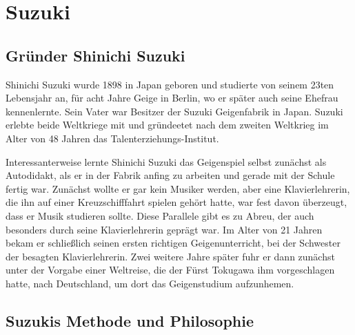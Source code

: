 \section{Suzuki}

\subsection{Gründer Shinichi Suzuki}

Shinichi Suzuki wurde 1898 in Japan geboren und studierte von seinem 23ten
Lebensjahr an, für acht Jahre Geige in Berlin, wo er später auch seine Ehefrau
kennenlernte. Sein Vater war Besitzer der Suzuki Geigenfabrik in Japan. Suzuki
erlebte beide Weltkriege mit und gründeetet nach dem zweiten Weltkrieg im Alter
von 48 Jahren das Talenterziehungs-Institut. 

Interessanterweise lernte Shinichi Suzuki das Geigenspiel selbst zunächst als
Autodidakt, als er in der Fabrik anfing zu arbeiten und gerade mit der Schule
fertig war. Zunächst wollte er gar kein Musiker werden, aber eine
Klavierlehrerin, die ihn auf einer Kreuzschifffahrt spielen gehört hatte, war
fest davon überzeugt, dass er Musik studieren sollte.
\autocite[89]{suzuki:erziehung_ist_liebe} Diese Parallele gibt es zu Abreu, der
auch besonders durch seine Klavierlehrerin geprägt war. Im Alter von 21 Jahren
bekam er schließlich seinen ersten richtigen Geigenunterricht, bei der Schwester
der besagten Klavierlehrerin. Zwei weitere Jahre später fuhr er dann
zunächst unter der Vorgabe einer Weltreise, die der Fürst Tokugawa ihm
vorgeschlagen hatte, nach Deutschland, um dort das Geigenstudium aufzunhemen.
\autocite[90ff]{suzuki:erziehung_ist_liebe}



\subsection{Suzukis Methode und Philosophie}

